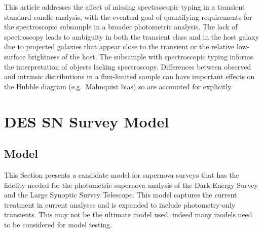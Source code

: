 \documentclass[preprint,3p]{elsarticle}
\begin{document}
This article addresses the affect of missing spectroscopic typing in
a transient standard candle analysis, with the eventual goal of quantifying
requirements for the spectroscopic subsample in a broader photometric analysis.
The lack of spectroscopy leads to ambiguity in both the transient class and
in the host galaxy due to projected galaxies that appear close to the transient or
the relative low-surface brightness of the host.  The subsample with
spectroscopic typing informs the interpretation of objects lacking spectroscopy.
Differences between observed and
intrinsic distributions in a flux-limited sample can have important effects on the Hubble
diagram  (e.g.\ Malmquist bias) so are accounted for explicitly.

\section{DES SN Survey Model}
\label{snIamodel:sec}
\subsection{Model}
\label{model:sec}
This Section presents a candidate model
for supernova surveys that has the fidelity needed for the photometric
supernova analysis of the Dark Energy Survey and the Large Synoptic Survey Telescope.
This model captures the current treatment in current analyses and is expanded to include
photometry-only transients.  This may not be the ultimate model used, indeed many models
need to be considered for model testing.
\end{document}
